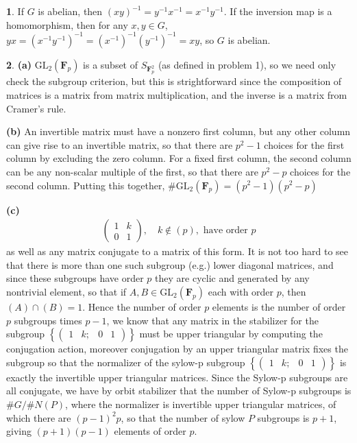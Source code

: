 \documentclass[10.5pt]{article}
\theoremstyle{definition}
\newtheorem{pb}{}
\begin{document}
    \begin{pb}
        If \(G\) is abelian, then \((xy)^{-1} = y^{-1}x^{-1} = x^{-1}y^{-1}\). If the inversion map is a homomorphism, then for any \(x,y \in G\), \(yx = (x^{-1}y^{-1})^{-1} = (x^{-1})^{-1}(y^{-1})^{-1} = xy\), so \(G\) is abelian.
    \end{pb}
    \begin{pb}
        \textbf{(a)} \(\text{GL}_2(\mathbf{F}_p)\) is a subset of \(S_{\mathbf{F}_p^{2}}\) (as defined in problem 1), so we need only check the subgroup criterion, but this is strightforward since the composition of matrices is a matrix from matrix multiplication, and the inverse is a matrix from Cramer's rule.

        \textbf{(b)} An invertible matrix must have a nonzero first column, but any other column can give rise to an invertible matrix, so that there are \(p^2 - 1\) choices for the first column by excluding the zero column. For a fixed first column, the second column can be any non-scalar multiple of the first, so that there are \(p^2 - p\) choices for the second column. Putting this together, \(\# \text{GL}_2(\mathbf{F}_p) = (p^2-1)(p^2 - p)\)

        \textbf{(c)} \begin{align*}
            \begin{pmatrix}
                1 & k \\ 0 & 1
            \end{pmatrix}, \quad k\not \in (p), \text{ have order }p
        \end{align*}
        as well as any matrix conjugate to a matrix of this form. It is not too hard to see that there is more than one such subgroup (e.g.) lower diagonal matrices, and since these subgroups have order \(p\) they are cyclic and generated by any nontrivial element, so that if \(A,B \in \text{GL}_2(\mathbf{F}_p)\) each with order \(p\), then \((A) \cap (B) = 1\). Hence the number of order \(p\) elements is the number of order \(p\) subgroups times \(p-1\), we know that any matrix in the stabilizer for the subgroup \(\left\{\begin{pmatrix}
            1 & k;& 0 & 1
        \end{pmatrix}\right\}\) must be upper triangular by computing the conjugation action, moreover conjugation by an upper triangular matrix fixes the subgroup so that the normalizer of the sylow-p subgroup \(\left\{\begin{pmatrix}
            1 & k;& 0 & 1
        \end{pmatrix}\right\}\) is exactly the invertible upper triangular matrices. Since the Sylow-p subgroups are all conjugate, we have by orbit stabilizer that the number of Sylow-p subgroups is \(\#G/\#N(P)\), where the normalizer is invertible upper triangular matrices, of which there are \((p-1)^2p\), so that the number of sylow \(P\) subgroups is \(p+1\), giving \((p+1)(p-1)\) elements of order \(p\).


\end{pb}
\end{document}

